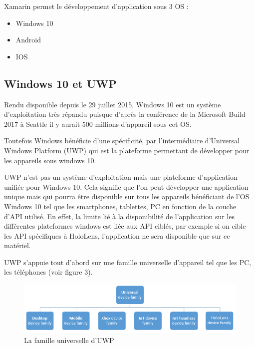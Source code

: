\documentclass[11]{article}
\begin{document}
\vspace{0.5cm}

Xamarin permet le développement d’application sous 3 OS :

\begin{itemize}
\item Windows 10
\item Android
\item IOS
\end{itemize}

\subsection{Windows 10 et UWP}

Rendu disponible depuis le 29 juillet 2015, Windows 10 est un système d’exploitation très répandu puisque d’après la conférence de la Microsoft Build 2017 à Seattle il y aurait 500 millions d’appareil sous cet OS.
 
\vspace{0.5cm}

Toutefois Windows bénéficie d’une spécificité, par l’intermédiaire d’Universal Windows Platform (UWP) qui est la plateforme permettant de développer pour les appareils sous windows 10.
 
\vspace{0.5cm}

UWP n’est pas un système d’exploitation mais une plateforme d’application unifiée pour Windows 10. Cela signifie que l’on peut développer une application unique mais qui pourra être disponible sur tous les appareils bénéficiant de l’OS Windows 10 tel que les smartphones, tablettes, PC en fonction de la couche d’API utilisé. En effet, la limite lié à la disponibilité de l’application sur les différentes plateformes windows est liée aux API ciblés, par exemple si on cible les API spécifiques à HoloLens, l’application ne sera disponible que sur ce matériel.
 
\vspace{0.5cm}

UWP s’appuie tout d’abord sur une famille universelle d’appareil tel que les PC, les téléphones (voir figure 3).

\vspace{0.5cm}

\begin{figure}[h]
    \centering
    \includegraphics[width=1\textwidth]{uwp}
    \caption{La famille universelle d'UWP}
    \label{bat}
\end{figure}
\end{document}
